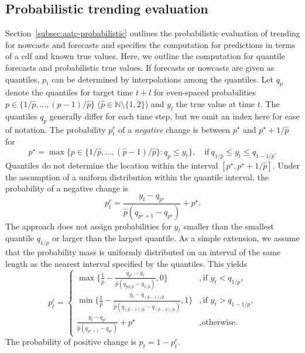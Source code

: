 \documentclass[pdflatex]{sn-jnl}
\theoremstyle{plain}%
\theoremstyle{definition}
\newcommand{\N}{\mathbb{N}}
\newcommand{\pmax}{\hat{p}} %
\newcommand{\pc}{p^c}
\begin{document}
\subsection{Probabilistic trending evaluation}\label{subsec:app-probabilistic-trending-evaluation}

Section~\ref{subsec:aatc-probabilistic} outlines the probabilistic evaluation of trending for nowcasts and forecasts and specifies the computation for predictions in terms of a \ac{cdf} and known true values.
Here, we outline the computation for quantile forecasts and probabilistic true values.
If forecasts or nowcasts are given as quantiles, $p_t$ can be determined by interpolations among the quantiles.
Let $q_p$ denote the quantiles for target time $t+l$ for even-spaced probabilities $p \in \{1/\pmax, \dots, (p-1) / \pmax\}$ ($\pmax \in \N \setminus \{1, 2\}$) and $y_t$ the true value at time $t$.
The quantiles $q_p$ generally differ for each time step, but we omit an index here for ease of notation.
The probability $\pc_t$ of a \textit{negative} change is between $p^{\star}$ and $p^{\star} + 1/\pmax$ for
\begin{equation*}
    p^{\star} = \max \{p \in \{1/\pmax, \dots, (\pmax-1) / \pmax\}: q_p \leq y_t\} , \quad \text{if}\ q_{1/\pmax} \leq y_t \leq q_{1 - 1/\pmax}.
\end{equation*}
Quantiles do not determine the location within the interval $[p^{\star}, p^{\star} + 1/\pmax]$.
Under the assumption of a uniform distribution within the quantile interval, the probability of a negative change is
\begin{equation*}
    \pc_t = \frac{y_t - q_{p^\star}}{\pmax (q_{p^{\star} + 1} - q_{p^{\star}})} + p^{\star}.
\end{equation*}
The approach does not assign probabilities for $y_t$ smaller than the smallest quantile $q_{1/p}$ or larger than the largest quantile.
As a simple extension, we assume that the probability mass is uniformly distributed on an interval of the same length as the nearest interval specified by the quantiles.
This yields
\begin{equation*}
\pc_t = \begin{cases}
    \max \{\frac{1}{\pmax} - \frac{q_{p^\star} - y_t}{\pmax (q_{p2/\pmax} - q_{1/\pmax})}, 0\} &, \text{if } y_t < q_{1/p}, \\
    \min \{\frac{1}{\pmax} - \frac{y_t - q_{(\pmax-1)/\pmax}}{\pmax (q_{(\pmax-1)/\pmax} - q_{(\pmax-2)/\pmax})}, 1\} &, \text{if } y_t > q_{1 - 1/p}, \\
    \frac{y_t - q_{p^\star}}{\pmax (q_{p^{\star} + 1} - q_{p^{\star}})} + p^{\star} &, \text{otherwise.}
\end{cases}
\end{equation*}
The probability of positive change is $p_t = 1 - \pc_t$.
\end{document}
